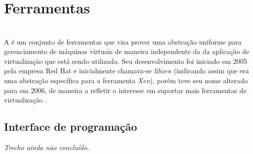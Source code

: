 \section{Ferramentas}



\section{\libvirt}\label{sec:libvirt}


A \libvirt{} é um conjunto de ferramentas que visa prover uma abstração
uniforme para gerenciamento de máquinas virtuais de maneira independente da
da aplicação de virtualização que está sendo utilizada. Seu desenvolvimento
foi iniciado em 2005 pela empresa Red Hat e inicialmente chamava-se
\emph{libxen} (indicando assim que era uma abstração específica para a
ferramenta \emph{Xen}), porém teve seu nome alterado para \libvirt{} em
2006, de maneira a refletir o interesse em suportar mais ferramentas de
virtualização .

\subsection{Interface de programação}\label{sec:libvirtapi}

\emph{Trecho ainda não concluído}.
